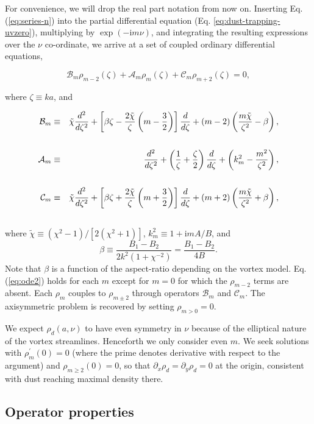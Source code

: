 \documentclass[apj]{emulateapj}
\def\blue#1{\textcolor{blue}{ #1}}
\newcommand{\Eq}[1]{Eq. (\ref{#1})}
\newcommand{\eq}[1]{\Eq{#1}}
\newcommand{\eqp}[1]{(Eq. \ref{#1})}
\newcommand{\beq}{\begin{equation}}
\newcommand{\eeq}{\end{equation}}
\newcommand{\beqn}{\begin{eqnarray}}
\newcommand{\eeqn}{\end{eqnarray}}
\newcommand{\tilchi}{\tilde\chi}
\begin{document}
For convenience, we will drop the real part notation from now on. Inserting
\eq{eq:series-n} into the partial differential equation \eqp{eq:dust-trapping-uvzero},
multiplying by $\exp{(-\mathrm{i}m\nu)}$, and integrating the resulting
expressions over the $\nu$ co-ordinate, we arrive at a set of coupled
ordinary differential equations, 

\beq\label{eq:ode2}
\mathcal{B}_m\rho_{m-2} (\zeta)+ \mathcal{A}_m\rho_m(\zeta) + \mathcal{C}_m\rho_{m+2}(\zeta) = 0,
\eeq

\noindent where $\zeta\equiv ka$, and

\beqn
\mathcal{B}_m &\equiv& \tilchi\frac{d^2}{d\zeta^2} + \left[\beta \zeta-
  \frac{2\tilchi}{\zeta}
  \left(m-\frac{3}{2}\right)\right]\frac{d}{d\zeta}+\left(m-2\right)\left(\frac{m\tilchi}{\zeta^2}-\beta\right), \notag\\
&&\label{eq:ops}\\ 
\mathcal{A}_m&\equiv&\frac{d^2}{d\zeta^2} +\left(\frac{1}{\zeta}+\frac{\zeta}{2}\right)\frac{d}{d\zeta} +\left(k_m^2-\frac{m^2}{\zeta^2}\right),\\
%
&&\notag\\
\mathcal{C}_m &\equiv& \tilchi\frac{d^2}{d\zeta^2}
+\left[\beta \zeta +
  \frac{2\tilchi}{\zeta}\left(m+\frac{3}{2}\right)\right]\frac{d}{d\zeta}
+ \left(m+2\right)\left(\frac{m\tilchi}{\zeta^2}
  +\beta\right),\notag\\
&&\label{eq:opsw}
\eeqn
where $\tilchi\equiv(\chi^2-1)/[2(\chi^2+1)]$, $k_m^2 \equiv 1+\mathrm{i}mA/B$, and
\beq
\beta \equiv \frac{B_1-B_2}{2k^2(1+\chi^{-2})} = \frac{B_1 - B_2}{4B}.
\eeq
Note that $\beta$ is a function of the aspect-ratio depending on the vortex model.
\eq{eq:ode2} holds for each $m$ except for $m=0$ for which the $\rho_{m-2}$ terms are absent. Each 
$\rho_m$ couples to $\rho_{m\pm2}$ through operators $\mathcal{B}_m$
and $\mathcal{C}_m$. The axisymmetric problem is recovered by
setting $\rho_{m>0}=0$. 

We expect $\rho_d(a,\nu)$ to have even symmetry in
$\nu$ because of the elliptical nature of the vortex streamlines. 
Henceforth we only consider even $m$. We seek solutions with  
$\rho_m^\prime(0)=0$ (where the prime denotes derivative with respect to the argument) and $\rho_{m\geq2}(0)=0$, so that
$\partial_x\rho_d=\partial_y\rho_d=0$ at the origin, consistent with 
dust reaching maximal density there.  

\subsection{Operator properties}
\end{document}
